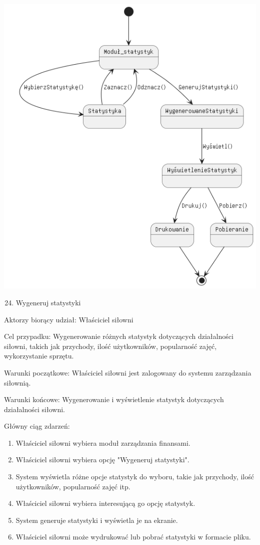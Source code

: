\documentclass[
]{article}
\providecommand{\tightlist}{%
  \setlength{\itemsep}{0pt}\setlength{\parskip}{0pt}}
\begin{document}
{\includegraphics{diagrams/state/wygeneruj_statystyki.png}}

\begin{enumerate}
\setcounter{enumi}{23}
\tightlist
\item
  {Wygeneruj statystyki}
\end{enumerate}

{Aktorzy biorący udział: Właściciel siłowni}

{Cel przypadku: Wygenerowanie różnych statystyk dotyczących działalności
siłowni, takich jak przychody, ilość użytkowników, popularność zajęć,
wykorzystanie sprzętu.}

{Warunki początkowe: Właściciel siłowni jest zalogowany do systemu
zarządzania siłownią.}

{Warunki końcowe: Wygenerowanie i wyświetlenie statystyk dotyczących
działalności siłowni.}

{Główny ciąg zdarzeń:}

\begin{enumerate}
\tightlist
\item
  {Właściciel siłowni wybiera moduł zarządzania finansami.}
\item
  {Właściciel siłowni wybiera opcję "Wygeneruj statystyki".}
\item
  {System wyświetla różne opcje statystyk do wyboru, takie jak
  przychody, ilość użytkowników, popularność zajęć itp.}
\item
  {Właściciel siłowni wybiera interesującą go opcję statystyk.}
\item
  {System generuje statystyki i wyświetla je na ekranie.}
\item
  {Właściciel siłowni może wydrukować lub pobrać statystyki w formacie
  pliku.}
\end{enumerate}
\end{document}
